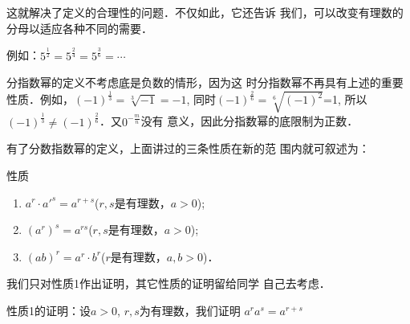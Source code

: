 这就解决了定义的合理性的问题．不仅如此，它还告诉
我们，可以改变有理数的分母以适应各种不同的需要．

例如：$5^{\tfrac{1}{2}}=5^{\tfrac{2}{4}}=5^{\tfrac{3}{6}}=\cdots$

\begin{rmk}
    分指数幂的定义不考虑底是负数的情形，因为这
    时分指数幂不再具有上述的重要性质．例如，$(-1)^{\tfrac{1}{3}}=\sqrt[3]{-1}=-1$, 同时$(-1)^{\tfrac{2}{6}}=\sqrt[6]{(-1)^2}$=1, 所以$(-1)^{\tfrac{1}{3}}\ne (-1)^{\tfrac{2}{6}}$．又$0^{-\tfrac{m}{n}}$没有
意义，因此分指数幂的底限制为正数．
\end{rmk}

有了分数指数幂的定义，上面讲过的三条性质在新的范
围内就可叙述为：
\begin{blk}{性质}
\begin{enumerate}
    \item  $a^r\cdot a'^s=a^{r+s}$\quad ($r,s$是有理数，$a>0$);
    \item  $(a^r)^s=a^{rs}$\quad ($r,s$是有理数，$a>0$);
    \item  $(ab)^r=a^r\cdot b^r$\quad ($r$是有理数，$a,b>0$)．
\end{enumerate}  
\end{blk}

我们只对性质1作出证明，其它性质的证明留给同学
自己去考虑．

性质1的证明：设$a>0$, $r,s$为有理数，我们证明
$a^r a^s=a^{r+s}$

